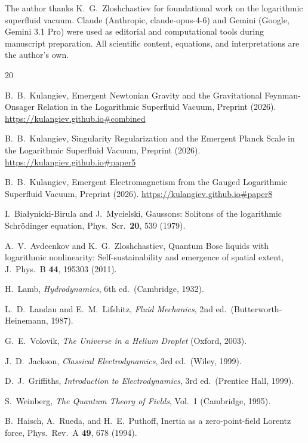 \documentclass[12pt, a4paper]{article}
\begin{document}
The author thanks K.~G.~Zloshchastiev for foundational
work on the logarithmic superfluid vacuum.
Claude (Anthropic, claude-opus-4-6) and Gemini (Google, Gemini 3.1 Pro) were used as editorial and computational tools during manuscript preparation. All scientific content, equations, and
interpretations are the author's own.


\begin{thebibliography}{20}

B.~B.~Kulangiev,
Emergent Newtonian Gravity and the Gravitational Feynman-Onsager Relation in the Logarithmic Superfluid Vacuum,
Preprint (2026).
\url{https://kulangiev.github.io#combined}

B.~B.~Kulangiev,
Singularity Regularization and the Emergent Planck Scale in the Logarithmic Superfluid Vacuum,
Preprint (2026).
\url{https://kulangiev.github.io#paper5}

B.~B.~Kulangiev,
Emergent Electromagnetism from the Gauged Logarithmic Superfluid Vacuum,
Preprint (2026).
\url{https://kulangiev.github.io#paper8}

I.~Bia{\l}ynicki-Birula and J.~Mycielski,
Gaussons: Solitons of the logarithmic Schr\"{o}dinger
equation,
Phys.\ Scr.\ \textbf{20}, 539 (1979).

A.~V.~Avdeenkov and K.~G.~Zloshchastiev,
Quantum Bose liquids with logarithmic nonlinearity:
Self-sustainability and emergence of spatial extent,
J.\ Phys.\ B \textbf{44}, 195303 (2011).

H.~Lamb,
\emph{Hydrodynamics}, 6th ed.\ (Cambridge, 1932).

L.~D.~Landau and E.~M.~Lifshitz,
\emph{Fluid Mechanics}, 2nd ed.\
(Butterworth-Heinemann, 1987).

G.~E.~Volovik,
\emph{The Universe in a Helium Droplet} (Oxford, 2003).

J.~D.~Jackson,
\emph{Classical Electrodynamics}, 3rd ed.\ (Wiley, 1999).

D.~J.~Griffiths,
\emph{Introduction to Electrodynamics}, 3rd ed.\
(Prentice Hall, 1999).

S.~Weinberg,
\emph{The Quantum Theory of Fields}, Vol.~1
(Cambridge, 1995).

B.~Haisch, A.~Rueda, and H.~E.~Puthoff,
Inertia as a zero-point-field Lorentz force,
Phys.\ Rev.\ A \textbf{49}, 678 (1994).

\end{thebibliography}
\end{document}
